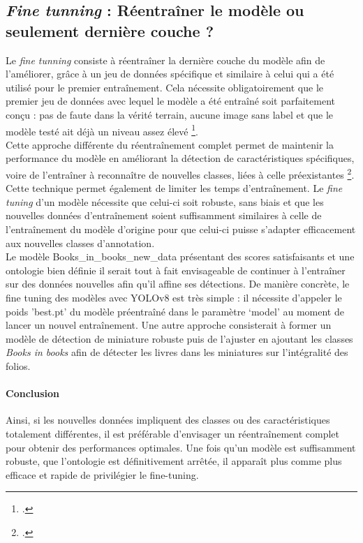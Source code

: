 \documentclass[12pt,twoside]{book}
\begin{document}
\newpage
\subsection{\textit{Fine tunning} : Réentraîner le modèle ou seulement dernière couche ?}

Le \textit{fine tunning} consiste à réentraîner la dernière couche du modèle afin de l'améliorer, grâce à un jeu de données spécifique et similaire à celui qui a été utilisé pour le premier entraînement. Cela nécessite obligatoirement que le premier jeu de données avec lequel le modèle a été entraîné soit parfaitement conçu : pas de faute dans la vérité terrain, aucune image sans label et que le modèle testé ait déjà un niveau assez élevé \footcite{minderer_simple_2022}. \\

Cette approche différente du réentraînement complet permet de maintenir la performance du modèle en améliorant la détection de caractéristiques spécifiques, voire de l’entraîner à reconnaître de nouvelles classes, liées à celle préexistantes \footcite{moreux_recherche_2019}. Cette technique permet également de limiter les temps d’entraînement. Le \textit{fine tuning} d’un modèle nécessite que celui-ci soit robuste, sans biais et que les nouvelles données d’entraînement soient suffisamment similaires à celle de l’entraînement du modèle d’origine pour que celui-ci puisse s'adapter efficacement aux nouvelles classes d’annotation. \\

Le modèle Books\_in\_books\_new\_data présentant des scores satisfaisants et une ontologie bien définie il serait tout à fait envisageable de continuer à l’entraîner sur des données nouvelles afin qu’il affine ses détections. De manière concrète, le fine tuning des modèles avec YOLOv8 est très simple : il nécessite d’appeler le poids 'best.pt' du modèle préentraîné dans le paramètre ‘model’ au moment de lancer un nouvel entraînement. Une autre approche consisterait à former un modèle de détection de miniature robuste puis de l’ajuster en ajoutant les classes \textit{Books in books} afin de détecter les livres dans les miniatures sur l'intégralité des folios. \\

\paragraph{Conclusion}Ainsi, si les nouvelles données impliquent des classes ou des caractéristiques totalement différentes, il est préférable d’envisager un réentraînement complet pour obtenir des performances optimales. Une fois qu’un modèle est suffisamment robuste, que l’ontologie est définitivement arrêtée, il apparaît plus comme plus efficace et rapide de privilégier le fine-tuning.
\end{document}
